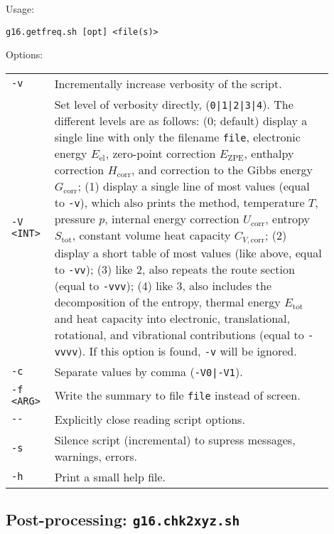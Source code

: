 \documentclass[   %
  final,          %
  a4paper         %
]{article}
\begin{document}
Usage: 

\lstinline`g16.getfreq.sh [opt] <file(s)>`

Options:

\begin{tabular}{p{0.1\linewidth}p{0.8\linewidth}}
  {\lstinline`-v`}       & Incrementally increase verbosity of the script. \\
  {\lstinline`-V <INT>`} & Set level of verbosity directly, ({\lstinline`0|1|2|3|4`}).
    The different levels are as follows: %
    (0; default) display a single line with only the filename {\lstinline`file`}, 
        electronic energy \(E_\mathrm{el}\), zero-point correction \(E_\mathrm{ZPE}\),
        enthalpy correction \(H_\mathrm{corr}\), 
        and correction to the Gibbs energy \(G_\mathrm{corr}\);
    (1) display a single line of most values (equal to {\lstinline`-v`}), 
        which also prints the method, temperature \(T\), pressure \(p\), 
        internal energy correction \(U_\mathrm{corr}\),
        entropy  \(S_\mathrm{tot}\), constant volume heat capacity \(C_{V,\mathrm{corr}}\);
    (2) display a short table of most values (like above, equal to {\lstinline`-vv`});
    (3) like 2, also repeats the route section (equal to {\lstinline`-vvv`});
    (4) like 3, also includes the decomposition of the entropy, 
        thermal energy \(E_\mathrm{tot}\) and heat capacity into electronic, translational,
        rotational, and vibrational contributions (equal to {\lstinline`-vvvv`}).
    If this option is found, {\lstinline`-v`} will be ignored. \\
  {\lstinline`-c`}       & Separate values by comma ({\lstinline`-V0|-V1`}). \\
  {\lstinline`-f <ARG>`} & Write the summary to file {\lstinline`file`} instead of screen. \\
  {\lstinline`--`}       & Explicitly close reading script options. \\
  {\lstinline`-s`}       & Silence script (incremental) to supress messages, warnings, errors. \\
  {\lstinline`-h`}       & Print a small help file. \\
\end{tabular}

\subsection{Post-processing: \texorpdfstring{{\lstinline`g16.chk2xyz.sh`}}{g16.chk2xyz.sh}}
\label{sec:g16.chk2xyz}
\end{document}
